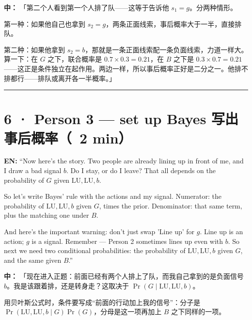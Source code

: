 \documentclass[11pt]{article}
\begin{document}
\textbf{中：} 「第二个人看到第一个人排了队——这等于告诉他 \(s_1=g\)。分两种情形。\par

第一种：如果他自己也拿到 \(s_2=g\)，两条正面线索，事后概率大于一半，直接排队。\par

第二种：如果他拿到 \(s_2=b\)，那就是一条正面线索配一条负面线索，力道一样大。算一下：在 \(G\) 之下，联合概率是 \(0.7\times 0.3=0.21\)，在 \(B\) 之下是 \(0.3\times 0.7=0.21\)——这正是条件独立在起作用。两边一样，所以事后概率正好是二分之一。他排不排都行——排队或离开各一半概率。」\par

\vspace{0.35em}\noindent\rule{\textwidth}{0.3pt}\par

\section*{6 · Person 3 — set up Bayes 写出事后概率（~2 min）}

\textbf{EN:} “Now here's the story. Two people are already lining up in front of me, and I draw a bad signal \(b\). Do I stay, or do I leave? That all depends on the probability of \(G\) given \(\mathrm{LU},\mathrm{LU},b\).\par

So let's write Bayes' rule with the actions and my signal. Numerator: the probability of \(\mathrm{LU},\mathrm{LU},b\) given \(G\), times the prior. Denominator: that same term, plus the matching one under \(B\).\par

And here's the important warning: don't just swap 'Line up' for \(g\). Line up is an action; \(g\) is a signal. Remember — Person 2 sometimes lines up even with \(b\). So next we need two conditional probabilities: the probability of \(\mathrm{LU},\mathrm{LU},b\) given \(G\), and the same given \(B\).”\par

\textbf{中：} 「现在进入正题：前面已经有两个人排上了队，而我自己拿到的是负面信号 \(b\)。我是该跟着排，还是转身走？这取决于 \(\Pr(G\mid \mathrm{LU},\mathrm{LU},b)\)。\par

用贝叶斯公式时，条件要写成“前面的行动加上我的信号”：分子是 \(\Pr(\mathrm{LU},\mathrm{LU},b\mid G)\Pr(G)\)，分母是这一项再加上 \(B\) 之下同样的一项。\par
\end{document}
